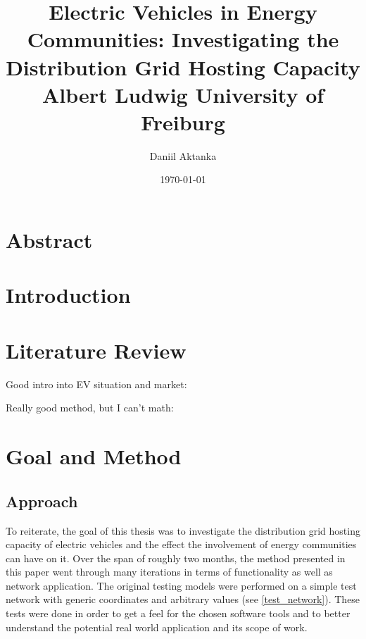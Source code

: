 \documentclass[a4paper,10pt]{report}
\begin{document}
\title{
	\vspace{2cm}
	{\LARGE Electric Vehicles in Energy Communities:}
	{\Large Investigating the Distribution Grid Hosting Capacity} \\[2cm]
	{\large Albert Ludwig University of Freiburg}
}
\author{
	\Large Daniil Aktanka
}
\date{
	\normalsize \today
}
\maketitle
\thispagestyle{empty}


\chapter*{Abstract}


\tableofcontents
\cleardoublepage
{}


\chapter{Introduction}
\chapter{Literature Review}\label{section_literature_review}
Good intro into EV situation and market: \cite{Das2020}

Really good method, but I can't math: \cite{Gruosso2019}

\chapter{Goal and Method}
\section{Approach}\label{section_approach}
To reiterate, the goal of this thesis was to investigate the distribution grid hosting capacity of electric vehicles and the effect the involvement of energy communities can have on it. Over the span of roughly two months, the method presented in this paper went through many iterations in terms of functionality as well as network application. The original testing models were performed on a simple test network with generic coordinates and arbitrary values (see \cref{test_network}). These tests were done in order to get a feel for the chosen software tools and to better understand the potential real world application and its scope of work.
\end{document}
